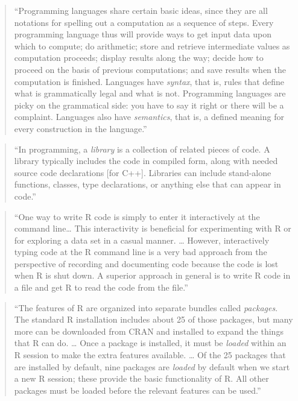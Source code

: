 \documentclass[]{tufte-book}
\begin{document}
\begin{quote}
``Programming languages share certain basic ideas, since they are all notations for spelling
out a computation as a sequence of steps. Every programming language thus will provide ways
to get input data upon which to compute; do arithmetic; store and retrieve intermediate
values as computation proceeds; display results along the way; decide how to proceed on the basis
of previous computations; and save results when the computation is finished. Languages have
\emph{syntax}, that is, rules that define what is grammatically legal and what is not.
Programming languages are picky on the grammatical side: you have to say it right or there
will be a complaint. Languages also have \emph{semantics}, that is, a defined meaning for every
construction in the language.'' \citep{kernighan2011d}
\end{quote}

\begin{quote}
``In programming, a \emph{library} is a collection of related pieces of code. A library typically
includes the code in compiled form, along with needed source code declarations {[}for C++{]}.
Libraries can include stand-alone functions, classes, type declarations, or anything else that
can appear in code.'' \citep{spraul2012think}
\end{quote}

\begin{quote}
``One way to write R code is simply to enter it interactively at the command line\ldots{} This
interactivity is beneficial for experimenting with R or for exploring a data set in a casual
manner. \ldots{} However, interactively typing code at the R command line is a very bad approach from
the perspective of recording and documenting code because the code is lost when R is shut down.
A superior approach in general is to write R code in a file and get R to read the code from the file.'' \citep{murrell2009introduction}
\end{quote}

\begin{quote}
``The features of R are organized into separate bundles called \emph{packages}. The standard R
installation includes about 25 of those packages, but many more can be downloaded from CRAN and
installed to expand the things that R can do. \ldots{} Once a package is installed, it must be
\emph{loaded} within an R session to make the extra features available. \ldots{} Of the 25 packages
that are installed by default, nine packages are \emph{loaded} by default when we start a new
R session; these provide the basic functionality of R. All other packages must be loaded
before the relevant features can be used.'' \citep{murrell2009introduction}
\end{quote}
\end{document}
